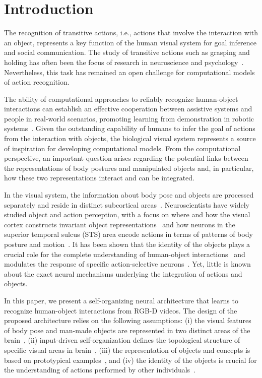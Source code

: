\documentclass[5p,times]{elsarticle}
\begin{document}
\section{Introduction}

The recognition of transitive actions, i.e., actions that involve the interaction with an object, represents a key function of the human visual system for goal inference and social communication.
The study of transitive actions such as grasping and holding has often been the focus of research in neuroscience and psychology~\cite{Fleischer,nelissen2006charting}.
Nevertheless, this task has remained an open challenge for computational models of action recognition.

The ability of computational approaches to reliably recognize human-object interactions can establish an effective cooperation between assistive systems and people in real-world scenarios, promoting learning from demonstration in robotic systems~\cite{prevete2008connectionist,tessitore2010motor}.
Given the outstanding capability of humans to infer the goal of actions from the interaction with objects, the biological visual system represents a source of inspiration for developing computational models.
From the computational perspective, an important question arises regarding the potential links between the representations of body postures and manipulated objects and, in particular, how these two representations interact and can be integrated.

In the visual system, the information about body pose and objects are processed separately and reside in distinct subcortical areas~\cite{beauchamp2002parallel,downing2011role,grill2013representation}.
Neuroscientists have widely studied object and action perception, with a focus on where and how the visual cortex constructs invariant object representations~\citep{HubelAndWiesel} and how neurons in the superior temporal sulcus (STS) area encode actions in terms of patterns of body posture and motion~\cite{grossman2002brain,giese2003neural}.
It has been shown that the identity of the objects plays a crucial role for the complete understanding of human-object interactions~\citep{saxe2004understanding} and modulates the response of specific action-selective neurons~\cite{gallese1996action, nelissen2005observing,yoon2012neural}.
Yet, little is known about the exact neural mechanisms underlying the integration of actions and objects.

In this paper, we present a self-organizing neural architecture that learns to recognize human-object interactions from RGB-D videos.
The design of the proposed architecture relies on the following assumptions: (i) the visual features of body pose and man-made objects are represented in two distinct areas of the brain~\cite{downing2011role, grill2013representation, beauchamp2002parallel}, (ii) input-driven self-organization defines the topological structure of specific visual areas in brain~\citep{miikkulainen2006computational}, (iii) the representation of objects and concepts is based on prototypical examples~\citep{rosch1975family}, and (iv) the identity of the objects is crucial for the understanding of actions performed by other individuals~\cite{saxe2004understanding, gallese1996action}.
\end{document}

